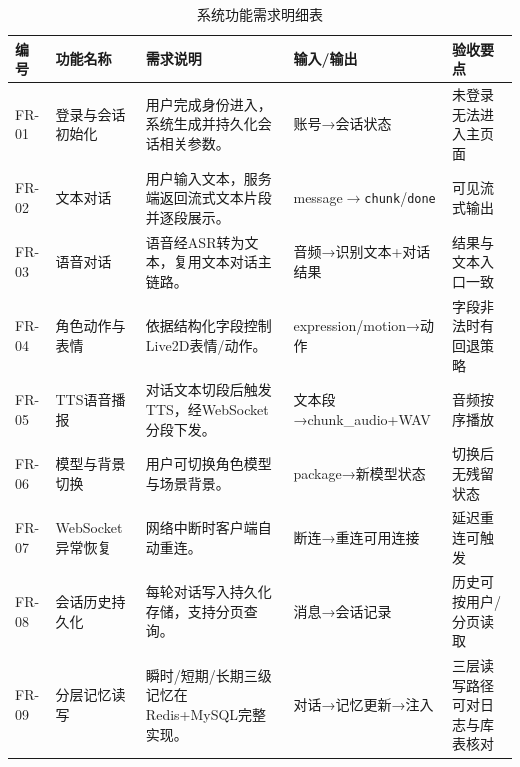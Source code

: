 \documentclass{base}
\begin{document}
\begin{table}[H]
    \centering
    \caption{系统功能需求明细表}
    \label{tab:functional_requirements}
    \begingroup
    \small
    \sloppy
    \setlength{\tabcolsep}{7pt}
    \renewcommand{\arraystretch}{1.38}
    \begin{tabularx}{\textwidth}{@{} >{\raggedright\arraybackslash}p{1.15cm} >{\raggedright\arraybackslash}p{2.35cm} Y >{\raggedright\arraybackslash}p{3.55cm} Y @{}}
        \toprule
        \textbf{编号} & \textbf{功能名称} & \textbf{需求说明}                               & \textbf{输入/输出}                                   & \textbf{验收要点}   \\
        \midrule
        FR-01       & 登录与会话初始化      & 用户完成身份进入，系统生成并持久化会话相关参数。                    & 账号→会话状态                                          & 未登录无法进入主页面      \\
        FR-02       & 文本对话          & 用户输入文本，服务端返回流式文本片段并逐段展示。                    & message$\rightarrow$\texttt{chunk}/\texttt{done} & 可见流式输出          \\
        FR-03       & 语音对话          & 语音经ASR转为文本，复用文本对话主链路。                       & 音频→识别文本+对话结果                                     & 结果与文本入口一致       \\
        FR-04       & 角色动作与表情       & 依据结构化字段控制Live2D表情/动作。                       & expression/motion→动作                             & 字段非法时有回退策略      \\
        FR-05       & TTS语音播报       & 对话文本切段后触发TTS，经WebSocket分段下发。                & 文本段→chunk\_audio+WAV                             & 音频按序播放          \\
        FR-06       & 模型与背景切换       & 用户可切换角色模型与场景背景。                             & package→新模型状态                                    & 切换后无残留状态        \\
        FR-07       & WebSocket异常恢复 & 网络中断时客户端自动重连。                               & 断连→重连可用连接                                        & 延迟重连可触发         \\
        FR-08       & 会话历史持久化        & 每轮对话写入持久化存储，支持分页查询。                         & 消息→会话记录                                          & 历史可按用户/分页读取     \\
        FR-09       & 分层记忆读写        & 瞬时/短期/长期三级记忆在Redis+MySQL完整实现。               & 对话→记忆更新→注入                                       & 三层读写路径可对日志与库表核对 \\

\end{tabularx}
\end{table}
\end{document}
